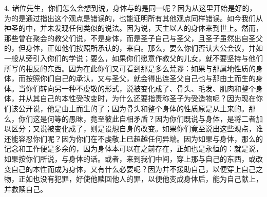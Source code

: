 4. 诸位先生，你们怎么会想到说，身体与的是同一呢？因为从这里开始是好的，为的是通过指出这个观点是错误的，也能证明所有其他观点同样错误。如今我们从神圣的中，并未发现任何类似的说法。因为说，天主以人的身体来到世上。然而，那些曾在聚会的教父们说，不是身体，而是圣子自己与圣父，且圣子虽然出自圣父的，但身体，正如他们按照所承认的，来自。那么，要么你们否认大公会议，并如一般从旁引入你们的学说；要么，如果你们愿意作教父的儿女，就不要坚持与他们所写的相反的东西。因为在此你们又可看到那是多么荒谬：如果与那属地性质的身体，而按照你们自己的承认，又与圣父，就会得出连圣父自己也与那由土而生的身体。当你们转向另一种不虔敬的形式，说被变化成了、骨头、毛发、肌肉和整个身体，并从其自己的本性受改变时，为什么还要指责称圣子为受造物呢？因为现在你们该公开说，他是由土而生的了；因为骨头和整个身体的性质原是从土来的。那么，你们这是何等的愚昧，竟至彼此自相矛盾？因为你们既说与身体，是将二者加以区分；又说被变化成了，则是设想自身的改变。如果你们竟至说出这些观点，谁还能容忍你们呢？因为你们在不虔敬上已超越任何异端。因为如果与身体，那么的记念和工作便是多余的，因为身体本可以在之前存在，正如也是永恒的：就是说，如果按你们所说，与身体的话。或者，来到我们中间，穿上那与自己的东西，或改变自己的本性而成为身体，又有什么必要呢？因为并不援助自己，以便穿上自己之物，正如也没有犯罪，好使他赎回他人的罪，以便他变成身体后，能为自己献上，并救赎自己。\par

